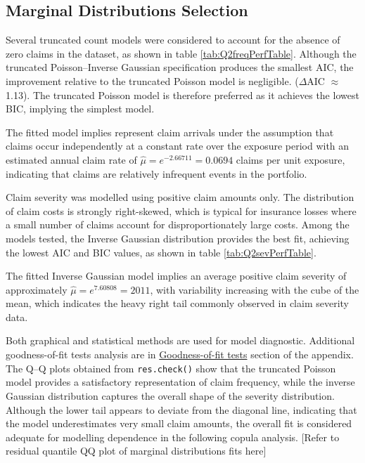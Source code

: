 \documentclass[
]{article}
\theoremstyle{plain}
\theoremstyle{definition}
\theoremstyle{remark}
\begin{document}
\subsection{Marginal Distributions Selection}\label{marginal-distributions-selection}

Several truncated count models were considered to account for the absence of zero claims in the dataset, as shown in table \ref{tab:Q2freqPerfTable}. Although the truncated Poisson--Inverse Gaussian specification produces the smallest AIC, the improvement relative to the truncated Poisson model is negligible. (\(\Delta\)AIC \(\approx\) 1.13). The truncated Poisson model is therefore preferred as it achieves the lowest BIC, implying the simplest model.

The fitted model implies represent claim arrivals under the assumption that claims occur independently at a constant rate over the exposure period with an estimated annual claim rate of \(\hat{\mu}=e^{-2.66711}=0.0694\) claims per unit exposure, indicating that claims are relatively infrequent events in the portfolio.

Claim severity was modelled using positive claim amounts only. The distribution of claim costs is strongly right-skewed, which is typical for insurance losses where a small number of claims account for disproportionately large costs. Among the models tested, the Inverse Gaussian distribution provides the best fit, achieving the lowest AIC and BIC values, as shown in table \ref{tab:Q2sevPerfTable}.

The fitted Inverse Gaussian model implies an average positive claim severity of approximately \(\hat{μ}=e^{7.60808} = 2011\), with variability increasing with the cube of the mean, which indicates the heavy right tail commonly observed in claim severity data.

Both graphical and statistical methods are used for model diagnostic. Additional goodness-of-fit tests analysis are in \hyperref[goodness-of-fit-tests]{Goodness-of-fit tests} section of the appendix.
The Q--Q plots obtained from \texttt{res.check()} show that the truncated Poisson model provides a satisfactory representation of claim frequency, while the inverse Gaussian distribution captures the overall shape of the severity distribution. Although the lower tail appears to deviate from the diagonal line, indicating that the model underestimates very small claim amounts, the overall fit is considered adequate for modelling dependence in the following copula analysis. {[}Refer to residual quantile QQ plot of marginal distributions fits here{]}
\end{document}
